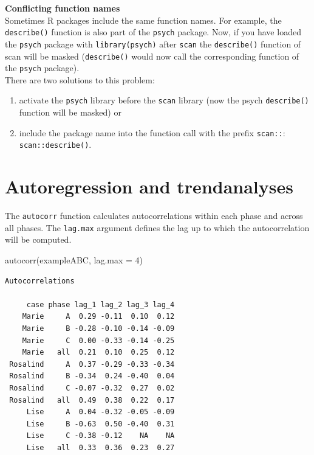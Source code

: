\documentclass[
]{book}
\makeatletter
\newenvironment{Shaded}{\begin{snugshade}}{\end{snugshade}}
\newcommand{\AttributeTok}[1]{\textcolor[rgb]{0.77,0.63,0.00}{#1}}
\newcommand{\DecValTok}[1]{\textcolor[rgb]{0.00,0.00,0.81}{#1}}
\newcommand{\FunctionTok}[1]{\textcolor[rgb]{0.00,0.00,0.00}{#1}}
\newcommand{\NormalTok}[1]{#1}
\providecommand{\tightlist}{%
  \setlength{\itemsep}{0pt}\setlength{\parskip}{0pt}}
\newenvironment{kframe}{%
\medskip{}
\setlength{\fboxsep}{.8em}
 \def\at@end@of@kframe{}%
 \ifinner\ifhmode%
  \def\at@end@of@kframe{\end{minipage}}%
  \begin{minipage}{\columnwidth}%
 \fi\fi%
 \def\FrameCommand##1{\hskip\@totalleftmargin \hskip-\fboxsep
 \colorbox{shadecolor}{##1}\hskip-\fboxsep
     \hskip-\linewidth \hskip-\@totalleftmargin \hskip\columnwidth}%
 \MakeFramed {\advance\hsize-\width
   \@totalleftmargin\z@ \linewidth\hsize
   \@setminipage}}%
 {\par\unskip\endMakeFramed%
 \at@end@of@kframe}
\newenvironment{rmdblock}[1]
  {
  \begin{itemize}
  \renewcommand{\labelitemi}{
    \raisebox{-.7\height}[0pt][0pt]{
      {\setkeys{Gin}{width=3em,keepaspectratio}\texttt{[image: images/\#1]}}
    }
  }
  \setlength{\fboxsep}{1em}
  \begin{kframe}
  \item
  }
  {
  \end{kframe}
  \end{itemize}
  }
\newenvironment{rmdnote}
  {\begin{rmdblock}{bulp}}
{\end{rmdblock}}
\makeatother
\begin{document}
\begin{rmdnote}
\textbf{Conflicting function names}\\
Sometimes R packages include the same function names. For example, the
\texttt{describe()} function is also part of the \texttt{psych} package.
Now, if you have loaded the \texttt{psych} package with
\texttt{library(psych)} after \texttt{scan} the \texttt{describe()}
function of scan will be masked (\texttt{describe()} would now call the
corresponding function of the \texttt{psych} package).\\
There are two solutions to this problem:

\begin{enumerate}
\def\labelenumi{\arabic{enumi}.}
\tightlist
\item
  activate the \texttt{psych} library before the \texttt{scan} library
  (now the psych \texttt{describe()} function will be masked) or
\item
  include the package name into the function call with the prefix
  \texttt{scan::}: \texttt{scan::describe()}.
\end{enumerate}
\end{rmdnote}

\hypertarget{autoregression-and-trendanalyses}{%
\section{Autoregression and trendanalyses}\label{autoregression-and-trendanalyses}}

The \texttt{autocorr} function calculates autocorrelations within each phase and across all phases. The \texttt{lag.max} argument defines the lag up to which the autocorrelation will be computed.

\begin{Shaded}
\begin{Highlighting}[]
\FunctionTok{autocorr}\NormalTok{(exampleABC, }\AttributeTok{lag.max =} \DecValTok{4}\NormalTok{)}
\end{Highlighting}
\end{Shaded}

\begin{verbatim}
Autocorrelations

     case phase lag_1 lag_2 lag_3 lag_4
    Marie     A  0.29 -0.11  0.10  0.12
    Marie     B -0.28 -0.10 -0.14 -0.09
    Marie     C  0.00 -0.33 -0.14 -0.25
    Marie   all  0.21  0.10  0.25  0.12
 Rosalind     A  0.37 -0.29 -0.33 -0.34
 Rosalind     B -0.34  0.24 -0.40  0.04
 Rosalind     C -0.07 -0.32  0.27  0.02
 Rosalind   all  0.49  0.38  0.22  0.17
     Lise     A  0.04 -0.32 -0.05 -0.09
     Lise     B -0.63  0.50 -0.40  0.31
     Lise     C -0.38 -0.12    NA    NA
     Lise   all  0.33  0.36  0.23  0.27
\end{verbatim}
\end{document}
